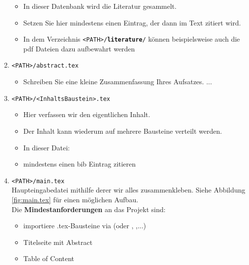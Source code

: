 \begin{enumerate}
	      \begin{itemize}\small
		      \item In dieser Datenbank wird die Literatur gesammelt.
		      \item Setzen Sie hier mindestens einen Eintrag, der dann im Text zitiert wird.
		      \item In dem Verzeichnis \texttt{<PATH>/\textbf{literature}/} können beispielsweise auch die pdf Dateien dazu aufbewahrt werden
	      \end{itemize}
	\item \texttt{<PATH>/abstract.tex}
	      \begin{itemize}\small
		      \item Schreiben Sie eine kleine Zusammenfassung Ihres Aufsatzes. ...
	      \end{itemize}
	\item \texttt{<PATH>/<InhaltsBaustein>.tex}
	      \begin{itemize}\small
		      \item Hier verfassen wir den eigentlichen Inhalt.
		      \item Der Inhalt kann wiederum auf mehrere Bausteine verteilt werden.
		      \item In dieser Datei: \texttt{}
		      \item mindestens einen bib Eintrag zitieren 
	      \end{itemize}
	\item \texttt{<PATH>/main.tex}\\\small
	      Haupteingabedatei mithilfe derer wir alles zusammenkleben. Siehe Abbildung \ref{fig:main.tex} für einen möglichen Aufbau.\\
	      Die \textbf{Mindestanforderungen} an das Projekt sind:\vspace{-0.1cm}
	      \begin{itemize}
		      \item importiere .tex-Bausteine via  (oder , ,...)
		      \item Titelseite mit Abstract
		      \item Table of Content

\end{itemize}
\end{enumerate}
